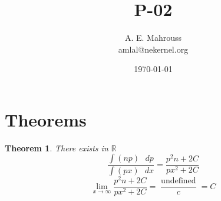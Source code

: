 \documentclass[10pt, twocolumn]{article}
\title{P-02}
\author{A. E. Mahrouss\\amlal@nekernel.org}
\date{\today}
\theoremstyle{plain}
\newtheorem{theorem}{Theorem}[section]
\theoremstyle{definition}
\theoremstyle{remark}
\begin{document}
\maketitle

\section{Theorems}
\begin{theorem}
    There exists in $\mathbb{R}$
    \begin{equation}
        \frac{\int (np) \text{ } dp}{\int (px) \text{ } dx} = \frac{p^2n+2C}{px^2+2C}
    \end{equation}
    \begin{equation}
        \lim_{x\to\infty} \frac{p^2n+2C}{px^2+2C} = \frac{\operatorname{undefined}}{c} = C
    \end{equation}
\end{theorem}
\end{document}
